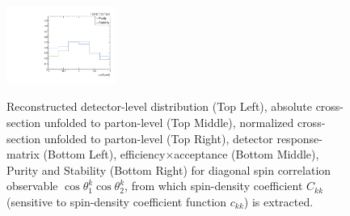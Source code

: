 \begin{figure}[htb]
\begin{center}
 \includegraphics[width=0.32\textwidth]{fig_fullRun2UL/unfolding/combined/PurStab_c_kk.pdf} \\
\caption{Reconstructed detector-level distribution (Top Left), absolute cross-section unfolded to parton-level (Top Middle), normalized cross-section unfolded to parton-level (Top Right), detector response-matrix (Bottom Left), efficiency$\times$acceptance (Bottom Middle), Purity and Stability (Bottom Right) for diagonal spin correlation observable $\cos\theta_{1}^{k}\cos\theta_{2}^{k}$, from which spin-density coefficient $C_{kk}$ (sensitive to spin-density coefficient function $c_{k k}$) is extracted.}
\label{fig:c_kk}
\end{center}
\end{figure}
\clearpage
